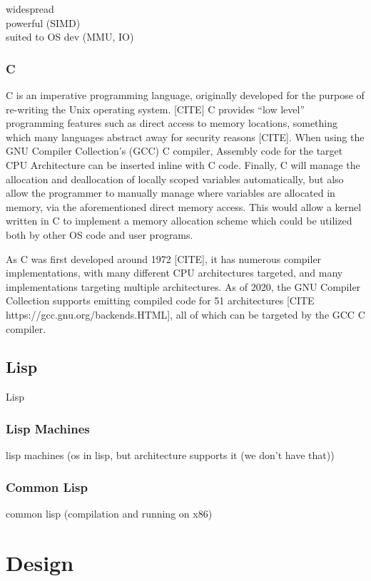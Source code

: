 \documentclass[11pt]{report}
\begin{document}
widespread \\
powerful (SIMD) \\
suited to OS dev (MMU, IO) \\

\subsection{C}
C is an imperative programming language, originally developed for the purpose of re-writing the Unix operating system. [CITE] C provides ``low level'' programming features such as direct access to memory locations, something which many languages abstract away for security reasons [CITE]. When using the GNU Compiler Collection's (GCC) C compiler, Assembly code for the target CPU Architecture can be inserted inline with C code. Finally, C will manage the allocation and deallocation of locally scoped variables automatically, but also allow the programmer to manually manage where variables are allocated in memory, via the aforementioned direct memory access. This would allow a kernel written in C to implement a memory allocation scheme which could be utilized both by other OS code and user programs.

As C was first developed around 1972 [CITE], it has numerous compiler implementations, with many different CPU architectures targeted, and many implementations targeting multiple architectures. As of 2020, the GNU Compiler Collection supports emitting compiled code for 51 architectures [CITE https://gcc.gnu.org/backends.HTML], all of which can be targeted by the GCC C compiler.

\section{Lisp}
Lisp

\subsection{Lisp Machines}
lisp machines (os in lisp, but architecture supports it (we don't have that))

\subsection{Common Lisp}
common lisp (compilation and running on x86)

\chapter{Design}
\end{document}
